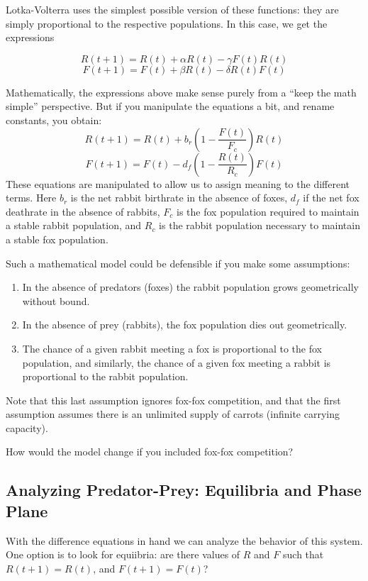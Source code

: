 Lotka-Volterra uses the simplest possible version of these functions:  they are simply proportional to the respective populations.  In this case, we get the expressions

$$R(t+1) = R(t) + \alpha R(t) - \gamma F(t) R(t)$$
$$F(t+1) = F(t) + \beta R(t) - \delta R(t) F(t)$$

Mathematically, the expressions above make sense purely from a ``keep the math simple'' perspective.  But if you manipulate the equations a bit, and rename constants,  you obtain:
$$R(t+1) = R(t) + b_r (1 - \frac{F(t)}{F_c}) R(t)$$
$$F(t+1) = F(t) - d_f (1-\frac{R(t)}{R_c}) F(t)$$
These equations are manipulated to allow us to assign meaning to the different terms.  Here $b_r$ is the net rabbit birthrate in the absence of foxes, $d_f$ if the net fox deathrate in the absence of rabbits, $F_c$ is the fox population required to maintain a stable rabbit population, and $R_c$ is the rabbit population necessary to maintain a stable fox population.

Such a mathematical model could be defensible if you make some assumptions:
\begin{enumerate}
\item In the absence of predators (foxes) the rabbit population grows geometrically without bound.
\item In the absence of prey (rabbits), the fox population dies out geometrically.
\item The chance of a given rabbit meeting a fox is proportional to the fox population, and similarly, the chance of a given fox meeting a rabbit is proportional to the rabbit population. 
\end{enumerate}
Note that this last assumption ignores fox-fox competition, and that the first assumption assumes there is an unlimited supply of carrots (infinite carrying capacity).  

\begin{del}
How would the model change if you included fox-fox competition?
\end{del}


\subsection*{Analyzing Predator-Prey: Equilibria and Phase Plane}

With the difference equations in hand  we can analyze the behavior of this system.  One option is to look for equiibria: are there values of $R$ and $F$ such that $R(t+1) = R(t)$, and $F(t+1) = F(t)$?  

